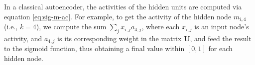 

	
%	
	
In a classical autoencoder, the activities of the hidden units are computed via equation \ref{eq:sig-m-ac}. For example, to get the activity of the hidden node $m_{i,4}$ (i.e., $k = 4$), 
we compute the sum $\sum_{j} x_{i,j} a_{4,j}$, where each $x_{i,j}$ is an input node's activity, and $a_{4,j}$ is its corresponding weight in the matrix $\textbf{U}$,
and feed the result to the sigmoid function, thus obtaining a final value within $[0,1]$ for each hidden node.

